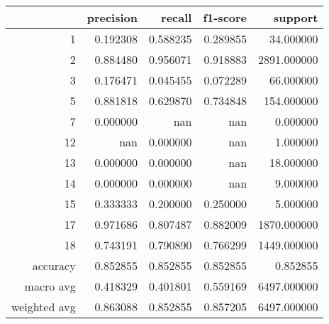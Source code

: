 \begin{tabular}{rrrrr}
\toprule
 & precision & recall & f1-score & support \\
\midrule
1 & 0.192308 & 0.588235 & 0.289855 & 34.000000 \\
2 & 0.884480 & 0.956071 & 0.918883 & 2891.000000 \\
3 & 0.176471 & 0.045455 & 0.072289 & 66.000000 \\
5 & 0.881818 & 0.629870 & 0.734848 & 154.000000 \\
7 & 0.000000 & nan & nan & 0.000000 \\
12 & nan & 0.000000 & nan & 1.000000 \\
13 & 0.000000 & 0.000000 & nan & 18.000000 \\
14 & 0.000000 & 0.000000 & nan & 9.000000 \\
15 & 0.333333 & 0.200000 & 0.250000 & 5.000000 \\
17 & 0.971686 & 0.807487 & 0.882009 & 1870.000000 \\
18 & 0.743191 & 0.790890 & 0.766299 & 1449.000000 \\
accuracy & 0.852855 & 0.852855 & 0.852855 & 0.852855 \\
macro avg & 0.418329 & 0.401801 & 0.559169 & 6497.000000 \\
weighted avg & 0.863088 & 0.852855 & 0.857205 & 6497.000000 \\
\bottomrule
\end{tabular}
